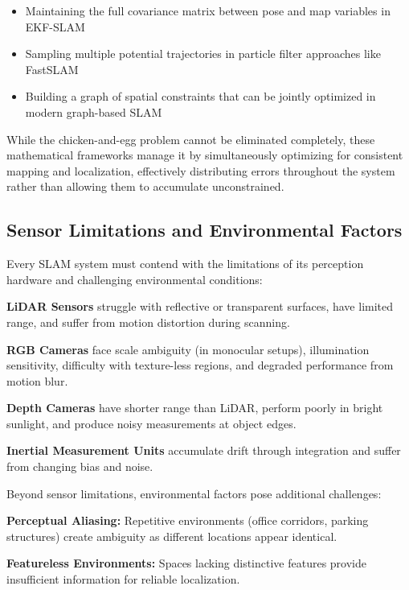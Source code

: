 \documentclass[12pt]{article}
\begin{document}
    \begin{itemize}
        \item Maintaining the full covariance matrix between pose and map variables in EKF-SLAM \cite{ekf_slam}
        \item Sampling multiple potential trajectories in particle filter approaches like FastSLAM \cite{fast_slam}
        \item Building a graph of spatial constraints that can be jointly optimized in modern graph-based SLAM
    \end{itemize}

    \newpage
    While the chicken-and-egg problem cannot be eliminated completely, these mathematical frameworks manage it by simultaneously optimizing for consistent mapping and localization, effectively distributing errors 
    throughout the system rather than allowing them to accumulate unconstrained.    
    
    \subsection{Sensor Limitations and Environmental Factors}
    
    Every SLAM system must contend with the limitations of its perception hardware and challenging environmental conditions:
    
    \textbf{LiDAR Sensors} struggle with reflective or transparent surfaces, have limited range, and suffer from motion distortion during scanning.
    
    \textbf{RGB Cameras} face scale ambiguity (in monocular setups), illumination sensitivity, difficulty with texture-less regions, and degraded performance from motion blur.
    
    \textbf{Depth Cameras} have shorter range than LiDAR, perform poorly in bright sunlight, and produce noisy measurements at object edges.
    
    \textbf{Inertial Measurement Units} accumulate drift through integration and suffer from changing bias and noise.
    
    Beyond sensor limitations, environmental factors pose additional challenges:
    
    \textbf{Perceptual Aliasing:} Repetitive environments (office corridors, parking structures) create ambiguity as different locations appear identical.
    
    \textbf{Featureless Environments:} Spaces lacking distinctive features provide insufficient information for reliable localization.
    
\end{document}
